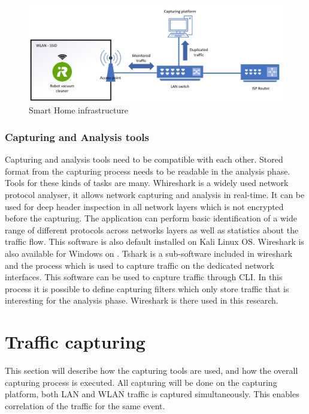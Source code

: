 \begin{figure}[H]
    \centering
    \includegraphics[width=\textwidth]{figures/WLAN_LAN_setup.png}
    \caption{Smart Home infrastructure}
    \label{fig:WLAN_LAN_setup}
\end{figure}



\subsubsection{Capturing and Analysis tools}
Capturing and analysis tools need to be compatible with each other. Stored format from the capturing process needs to be readable in the analysis phase. Tools for these kinds of tasks are many. Whireshark is a widely used network protocol analyser, it allows network capturing and analysis in real-time. It can be used for deep header inspection in all network layers which is not encrypted before the capturing. The application can perform basic identification of a wide range of different protocols across networks layers as well as statistics about the traffic flow. This software is also default installed on Kali Linux OS. Wireshark is also available for Windows on \cite{wireshark_download_2016}.
Tshark is a sub-software included in wireshark and the process which is used to capture traffic on the dedicated network interfaces. This software can be used to capture traffic through CLI. In this process it is possible to define capturing filters which only store traffic that is interesting for the analysis phase. Wireshark is there used in this research.


\section{Traffic capturing}
This section will describe how the capturing tools are used, and how the overall capturing process is executed. All capturing will be done on the capturing platform, both LAN and WLAN traffic is captured simultaneously. This enables correlation of the traffic for the same event.  

